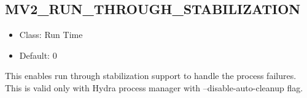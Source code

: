 %
%
%
%
\subsection{MV2\_RUN\_THROUGH\_STABILIZATION}
\label{def:nem-run-through-stab}

\begin{itemize}
    \item Class: Run Time
    \item Default: 0
\end{itemize}
This enables run through stabilization support to handle the process failures.
This is valid only with Hydra process manager with --disable-auto-cleanup flag.
